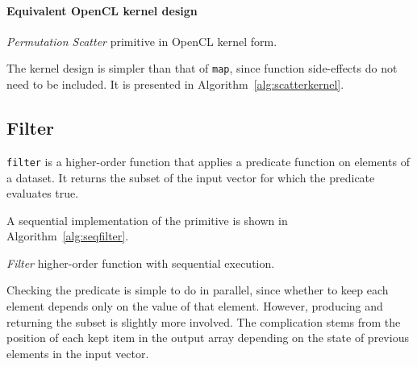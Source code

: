 \paragraph*{Equivalent \ac{OpenCL} kernel design}
\begin{algorithm}
  \caption{\emph{Permutation Scatter} primitive in \ac{OpenCL} kernel form.}
  \label{alg:scatterkernel}
  \begin{algorithmic}
    \EndFunction
  \end{algorithmic}
\end{algorithm}

The kernel design is simpler than that of \verb|map|, since function side-effects do not need to be included. It is presented in Algorithm~\ref{alg:scatterkernel}.

\subsection{Filter}
\verb|filter| is a higher-order function that applies a predicate function on elements of a dataset. It returns the subset of the input vector for which the predicate evaluates true. 

A sequential implementation of the primitive is shown in Algorithm~\ref{alg:seqfilter}.

\begin{algorithm}
  \caption{\emph{Filter} higher-order function with sequential execution.}
  \label{alg:seqfilter}

  \begin{algorithmic}
      \EndIf
      \EndFor
    \EndFunction
  \end{algorithmic}
\end{algorithm}

Checking the predicate is simple to do in parallel, since whether to keep each element depends only on the value of that element. However, producing and returning the subset is slightly more involved. The complication stems from the position of each kept item in the output array depending on the state of previous elements in the input vector.

